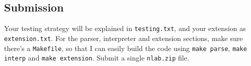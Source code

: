 \begin{exercise}
\subsection*{Submission}
Your testing strategy will be explained in \verb^testing.txt^, and your extension
as \verb^extension.txt^. For the parser, interpreter and extension sections, make
sure there's a \verb^Makefile^, so that I can easily build the code using \verb^make parse^,
\verb^make interp^ and \verb^make extension^. Submit a single \verb^nlab.zip^ file.

\end{exercise}

